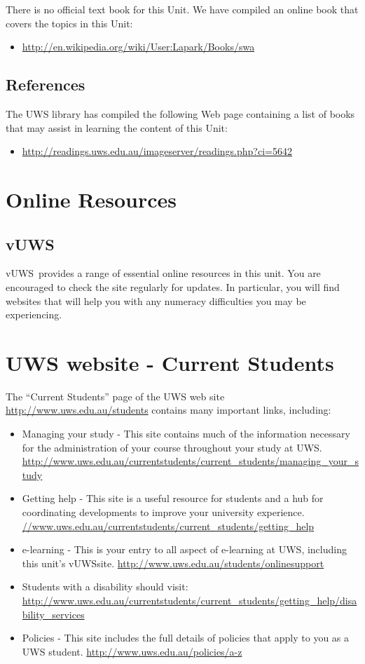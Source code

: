 \documentclass[a4paper,oneside]{book}
\newcommand{\vuws}{vUWS}
\begin{document}
There is no official text book for this Unit. We have compiled an
online book that covers the topics in this Unit:
\begin{itemize}
\item \url{http://en.wikipedia.org/wiki/User:Lapark/Books/swa}
\end{itemize}


\subsection*{References}

The UWS library has compiled the following Web page containing a list of books that may assist in learning the content of this Unit:
\begin{itemize}
\item \url{http://readings.uws.edu.au/imageserver/readings.php?ci=5642}
\end{itemize}


\section{Online Resources}

\subsection*{\vuws}

\vuws~provides a range of essential online resources in this unit.  You
are encouraged to check the site regularly for updates.  In
particular, you will find websites that will help you with any
numeracy difficulties you may be experiencing.


\section{UWS website - Current Students}
The ``Current Students'' page of the UWS web site
\url{http://www.uws.edu.au/students} contains many important links,
including:
\begin{itemize}
\item Managing your study - This site contains much of the information
  necessary for the administration of your course throughout your
  study at UWS.
  \url{http://www.uws.edu.au/currentstudents/current_students/managing_your_study}
\item Getting help - This site is a useful resource for students and a
  hub for coordinating developments to improve your university
  experience.
  \url{//www.uws.edu.au/currentstudents/current_students/getting_help}
\item e-learning - This is your entry to all aspect of e-learning at
  UWS, including this unit's \vuws site.
  \url{http://www.uws.edu.au/students/onlinesupport}
\item Students with a disability should visit:
  \url{http://www.uws.edu.au/currentstudents/current_students/getting_help/disability_services}
\item Policies - This site includes the full details of policies that
  apply to you as a UWS student.
  \url{http://www.uws.edu.au/policies/a-z}
\end{itemize}
\end{document}
